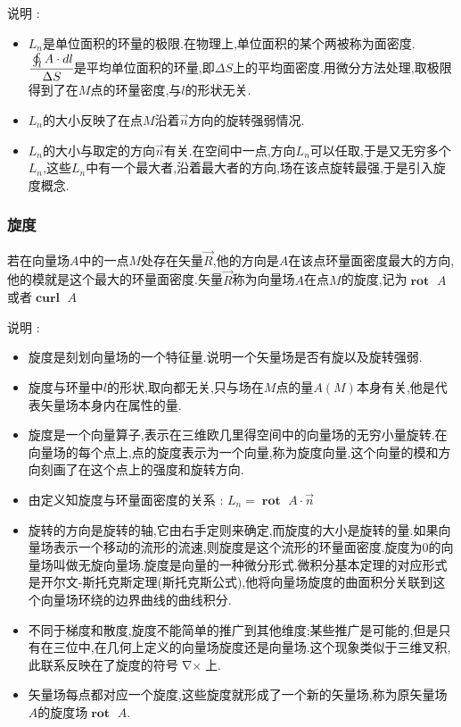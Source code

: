 \documentclass[UTF8,12pt]{ctexbook}
\newcommand{\curveIntegralOnLine}[1]{\oint_{#1}}
\DeclareMathOperator{\curlSymbol}{\nabla\times}
\DeclareMathOperator{\curlText}{\mathbf{curl}\ }
\DeclareMathOperator{\curlRotText}{\mathbf{rot}\ }
\begin{document}
{{{{{      说明 :
      \begin{itemize}
        \item $L_n$是单位面积的环量的极限.在物理上,单位面积的某个两被称为面密度.$\cfrac{\curveIntegralOnLine{l}A \cdot dl}{\Delta S}$是平均单位面积的环量,即$\Delta S$上的平均面密度.用微分方法处理,取极限得到了在$M$点的环量密度,与$l$的形状无关.
        \item $L_n$的大小反映了在点$M$沿着$\vec{n}$方向的旋转强弱情况.
        \item $L_n$的大小与取定的方向$\vec{n}$有关.在空间中一点,方向$L_n$可以任取,于是又无穷多个$L_n$,这些$L_n$中有一个最大者,沿着最大者的方向,场在该点旋转最强,于是引入旋度概念.
      \end{itemize}
    }%

    \subsubsection{旋度}{
      若在向量场$A$中的一点$M$处存在矢量$\vec{R}$,他的方向是$A$在该点环量面密度最大的方向,他的模就是这个最大的环量面密度.矢量$\vec{R}$称为向量场$A$在点$M$的旋度,记为$\curlRotText A$或者$\curlText A$

      说明 :
      \begin{itemize}
        \item 旋度是刻划向量场的一个特征量.说明一个矢量场是否有旋以及旋转强弱.
        \item 旋度与环量中$l$的形状,取向都无关,只与场在$M$点的量$A(M)$本身有关,他是代表矢量场本身内在属性的量.
        \item 旋度是一个向量算子,表示在三维欧几里得空间中的向量场的无穷小量旋转.在向量场的每个点上,点的旋度表示为一个向量,称为旋度向量.这个向量的模和方向刻画了在这个点上的强度和旋转方向.
        \item 由定义知旋度与环量面密度的关系 : $L_n = \curlRotText A \cdot \vec{n}$
        \item 旋转的方向是旋转的轴,它由右手定则来确定,而旋度的大小是旋转的量.如果向量场表示一个移动的流形的流速,则旋度是这个流形的环量面密度.旋度为0的向量场叫做无旋向量场.旋度是向量的一种微分形式.微积分基本定理的对应形式是开尔文-斯托克斯定理(斯托克斯公式),他将向量场旋度的曲面积分关联到这个向量场环绕的边界曲线的曲线积分.
        \item 不同于梯度和散度,旋度不能简单的推广到其他维度;某些推广是可能的,但是只有在三位中,在几何上定义的向量场旋度还是向量场.这个现象类似于三维叉积,此联系反映在了旋度的符号$\curlSymbol$上.
        \item 矢量场每点都对应一个旋度,这些旋度就形成了一个新的矢量场,称为原矢量场$A$的旋度场$\curlRotText A$.
      \end{itemize}
    }%

}}}}
\end{document}
